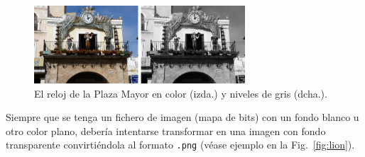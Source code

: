 \documentclass[11pt,a4paper]{article}
\begin{document}
\begin{figure}[H]
	\centering
		\includegraphics[width=0.7\textwidth]{2clockCR}
		\caption[Varias imágenes como una]{El reloj de la Plaza Mayor en color (izda.) y niveles de gris (dcha.).}
	\label{fig:2clock}
\end{figure}

Siempre que se tenga un fichero de imagen (mapa de bits) con un fondo blanco u otro color plano, debería intentarse transformar en una imagen con fondo transparente convirtiéndola al formato \texttt{.png} (véase ejemplo en la Fig.~\ref{fig:lion}).
\end{document}

